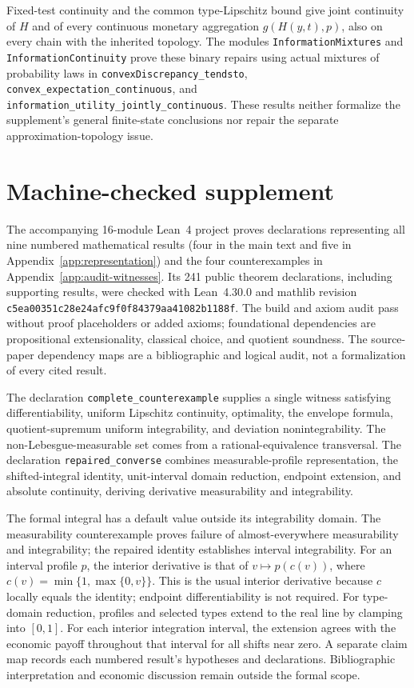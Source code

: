 \documentclass[11pt]{article}
\theoremstyle{remark}\newtheorem{remark}[theorem]{Remark}
\begin{document}
Fixed-test continuity and the common type-Lipschitz bound give joint
continuity of $H$ and of every continuous monetary aggregation
$g(H(y,t),p)$, also on every chain with the inherited topology.
The modules \texttt{InformationMixtures} and
\texttt{InformationContinuity} prove these binary repairs using actual
mixtures of probability laws in
\texttt{convexDiscrepancy\_tendsto},
\texttt{convex\_expectation\_continuous}, and
\texttt{information\_utility\_jointly\_continuous}.
These results neither formalize the supplement's general finite-state
conclusions nor repair the separate approximation-topology issue.




\clearpage
\section{Machine-checked supplement}\label{app:formal}
The accompanying 16-module Lean~4 project proves declarations representing all nine numbered mathematical results (four in the main text and five in Appendix~\ref{app:representation}) and the four counterexamples in Appendix~\ref{app:audit-witnesses}. Its 241 public theorem declarations, including supporting results, were checked with Lean~4.30.0 and mathlib revision \texttt{c5ea00351c28e24afc9f0f84379aa41082b1188f}. The build and axiom audit pass without proof placeholders or added axioms; foundational dependencies are propositional extensionality, classical choice, and quotient soundness. The source-paper dependency maps are a bibliographic and logical audit, not a formalization of every cited result.

The declaration \texttt{complete\_counterexample} supplies a single witness satisfying differentiability, uniform Lipschitz continuity, optimality, the envelope formula, quotient-supremum uniform integrability, and deviation nonintegrability. The non-Lebesgue-measurable set comes from a rational-equivalence transversal. The declaration \texttt{repaired\_converse} combines measurable-profile representation, the shifted-integral identity, unit-interval domain reduction, endpoint extension, and absolute continuity, deriving derivative measurability and integrability.

The formal integral has a default value outside its integrability domain. The measurability counterexample proves failure of almost-everywhere measurability and integrability; the repaired identity establishes interval integrability. For an interval profile $p$, the interior derivative is that of $v\mapsto p(c(v))$, where $c(v)=\min\{1,\max\{0,v\}\}$. This is the usual interior derivative because $c$ locally equals the identity; endpoint differentiability is not required. For type-domain reduction, profiles and selected types extend to the real line by clamping into $[0,1]$. For each interior integration interval, the extension agrees with the economic payoff throughout that interval for all shifts near zero. A separate claim map records each numbered result's hypotheses and declarations. Bibliographic interpretation and economic discussion remain outside the formal scope.
\end{document}

